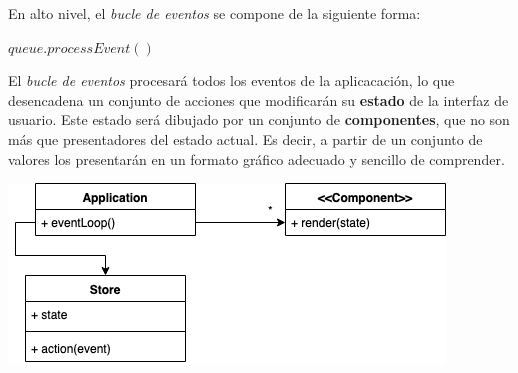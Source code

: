 En alto nivel, el \textit{bucle de eventos} se compone de la siguiente forma:

 \begin{algorithmic}
 		\State $queue.processEvent()$
 	\EndWhile
 \end{algorithmic}
 
 El  \textit{bucle de eventos} procesará todos los eventos de la aplicacación, lo que desencadena un conjunto de acciones que modificarán su \textbf{estado} de la interfaz de usuario. Este estado será dibujado por un conjunto de \textbf{componentes}, que no son más que presentadores del estado actual. Es decir, a partir de un conjunto de valores los presentarán en un formato gráfico adecuado y sencillo de comprender.

\vspace{5mm}
\begin{minipage}[h]{0.8\linewidth}
	\centering
	\includegraphics[width=\linewidth]{assets/ui}
	\label{img:ui}
\end{minipage}

\label{sec:ui}